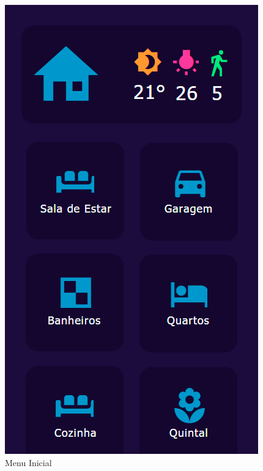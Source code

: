                 \graphicspath{ {figuras/} }
                \begin{figure}[h]
                    \centering
                    \includegraphics[scale=0.35]{2}
                    \caption{Menu Inicial}
                    \label{fig:menu}
                \end{figure}
                
